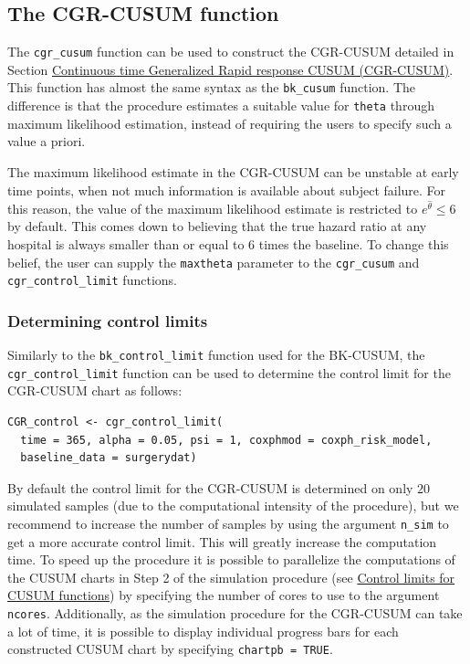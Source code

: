 \hypertarget{sec:CGRCUSUMfunction}{%
\subsection{The CGR-CUSUM function}\label{sec:CGRCUSUMfunction}}

The \texttt{cgr\_cusum} function can be used to construct the CGR-CUSUM detailed in Section \protect\hyperlink{sec:CGRCUSUM}{Continuous time Generalized Rapid response CUSUM (CGR-CUSUM)}. This function has almost the same syntax as the \texttt{bk\_cusum} function. The difference is that the procedure estimates a suitable value for \texttt{theta} through maximum likelihood estimation, instead of requiring the users to specify such a value a priori.

The maximum likelihood estimate in the CGR-CUSUM can be unstable at early time points, when not much information is available about subject failure. For this reason, the value of the maximum likelihood estimate is restricted to \(e^{\hat{\theta}} \leq 6\) by default. This comes down to believing that the true hazard ratio at any hospital is always smaller than or equal to \(6\) times the baseline. To change this belief, the user can supply the \texttt{maxtheta} parameter to the \texttt{cgr\_cusum} and \texttt{cgr\_control\_limit} functions.

\hypertarget{determining-control-limits-2}{%
\subsubsection{Determining control limits}\label{determining-control-limits-2}}

Similarly to the \texttt{bk\_control\_limit} function used for the BK-CUSUM, the \texttt{cgr\_control\_limit} function can be used to determine the control limit for the CGR-CUSUM chart as follows:

\begin{verbatim}
CGR_control <- cgr_control_limit(
  time = 365, alpha = 0.05, psi = 1, coxphmod = coxph_risk_model,
  baseline_data = surgerydat)
\end{verbatim}

By default the control limit for the CGR-CUSUM is determined on only \(20\) simulated samples (due to the computational intensity of the procedure), but we recommend to increase the number of samples by using the argument \texttt{n\_sim} to get a more accurate control limit. This will greatly increase the computation time. To speed up the procedure it is possible to parallelize the computations of the CUSUM charts in Step 2 of the simulation procedure (see \protect\hyperlink{sec:controllimitscusum}{Control limits for CUSUM functions}) by specifying the number of cores to use to the argument \texttt{ncores}. Additionally, as the simulation procedure for the CGR-CUSUM can take a lot of time, it is possible to display individual progress bars for each constructed CUSUM chart by specifying \texttt{chartpb\ =\ TRUE}.

